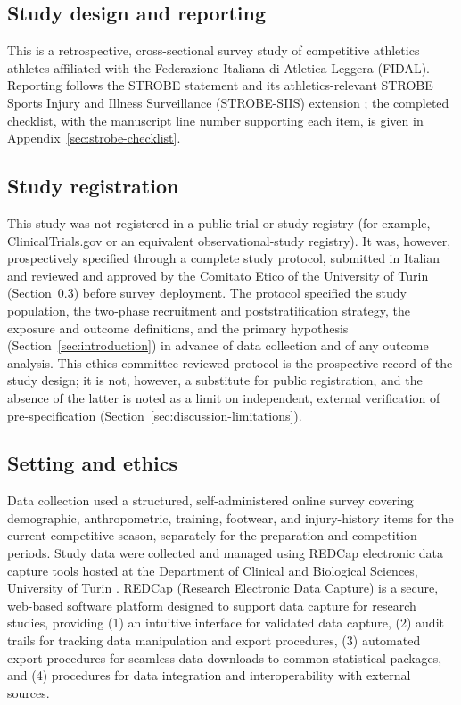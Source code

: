 \subsection{Study design and reporting}
\label{sec:design}
This is a retrospective, cross-sectional survey study of competitive athletics athletes affiliated with the Federazione Italiana di Atletica Leggera (FIDAL). Reporting follows the STROBE statement and its athletics-relevant STROBE Sports Injury and Illness Surveillance (STROBE-SIIS) extension \citep{vonelm2007strobe,bahr2020strobesiis}; the completed checklist, with the manuscript line number supporting each item, is given in Appendix~\ref{sec:strobe-checklist}.

\subsection{Study registration}
\label{sec:registration}
This study was not registered in a public trial or study registry (for example, ClinicalTrials.gov or an equivalent observational-study registry). It was, however, prospectively specified through a complete study protocol, submitted in Italian and reviewed and approved by the Comitato Etico of the University of Turin (Section~\ref{sec:setting}) before survey deployment. The protocol specified the study population, the two-phase recruitment and poststratification strategy, the exposure and outcome definitions, and the primary hypothesis (Section~\ref{sec:introduction}) in advance of data collection and of any outcome analysis. This ethics-committee-reviewed protocol is the prospective record of the study design; it is not, however, a substitute for public registration, and the absence of the latter is noted as a limit on independent, external verification of pre-specification (Section~\ref{sec:discussion-limitations}).

\subsection{Setting and ethics}
\label{sec:setting}
Data collection used a structured, self-administered online survey covering demographic, anthropometric, training, footwear, and injury-history items for the current competitive season, separately for the preparation and competition periods. Study data were collected and managed using REDCap electronic data capture tools hosted at the Department of Clinical and Biological Sciences, University of Turin \citep{harris2009redcap,harris2019redcap}. REDCap (Research Electronic Data Capture) is a secure, web-based software platform designed to support data capture for research studies, providing (1) an intuitive interface for validated data capture, (2) audit trails for tracking data manipulation and export procedures, (3) automated export procedures for seamless data downloads to common statistical packages, and (4) procedures for data integration and interoperability with external sources.

